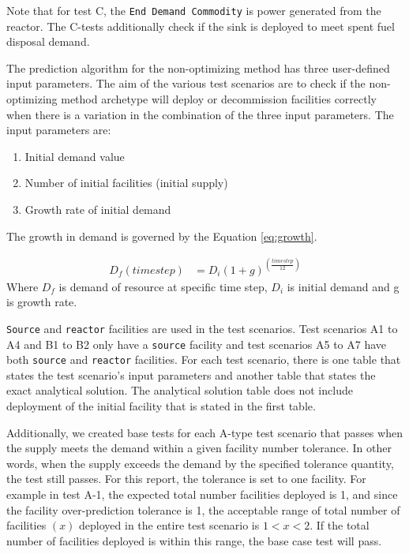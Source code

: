 \documentclass[11pt,letterpaper]{article}
\begin{document}
Note that for test C, the \texttt{End Demand Commodity} is power generated from the reactor. The C-tests additionally
check if the sink is deployed to meet spent fuel disposal demand.

The prediction algorithm for the non-optimizing method has three user-defined input parameters. The aim of the various test scenarios are to check if the non-optimizing method archetype will deploy or decommission facilities correctly when there is a variation in the combination of the three input parameters.  The input parameters are: 
\begin{enumerate}
	\item Initial demand value  
	\item Number of initial facilities (initial supply)
	\item Growth rate of initial demand
\end{enumerate}

The growth in demand is governed by the Equation \ref{eq:growth}. 

\begin{align}
\label{eq:growth}
D_f(timestep) &= D_i(1+g)^{(\frac{timestep}{12})}
\end{align}
Where $D_f$ is demand of resource at specific time step, $D_i$ is initial demand and g is growth rate. 

\texttt{Source} and \texttt{reactor} facilities are used in the test scenarios. Test scenarios A1 to A4 and B1 to B2 only have a \texttt{source} facility and test scenarios A5 to A7 have both \texttt{source} and \texttt{reactor} facilities. For each test scenario, there is one table that states the test scenario's input parameters and another table that states the exact analytical solution. The analytical solution table does not include deployment of the initial facility that is stated in the first table.

Additionally, we created base tests for each A-type test scenario that passes when the supply meets the demand within a given facility number tolerance. In other words, when the supply exceeds the demand by the specified tolerance quantity, the test still passes. For this report, the tolerance is set to one facility. For example in test A-1, the expected total number facilities deployed is 1, and since the facility over-prediction tolerance is 1, the acceptable range of total number of facilities $(x)$ deployed in the entire test scenario is $1<x<2$. If the total number of facilities deployed is within this range, the base case test will pass.  
\end{document}
